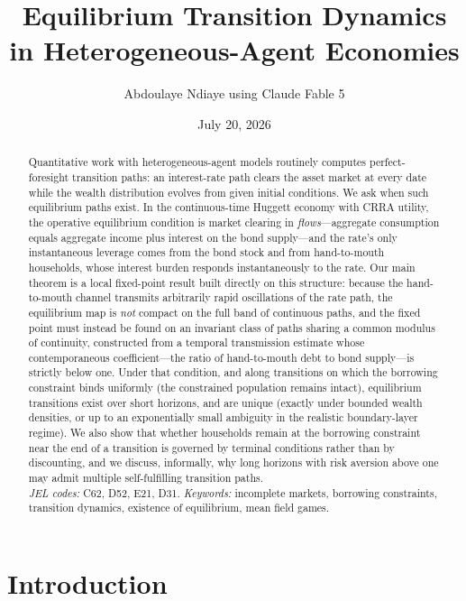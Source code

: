 \documentclass[11pt]{article}
\title{Equilibrium Transition Dynamics in Heterogeneous-Agent
Economies}
\author{Abdoulaye Ndiaye using Claude Fable 5}
\date{July 20, 2026}
\theoremstyle{definition}
\theoremstyle{remark}
\begin{document}
\maketitle

\begin{abstract}
\noindent
Quantitative work with heterogeneous-agent models routinely computes
perfect-foresight transition paths: an interest-rate path clears the
asset market at every date while the wealth distribution evolves from
given initial conditions. We ask when such equilibrium paths exist. In
the continuous-time Huggett economy with CRRA utility, the operative
equilibrium condition is market clearing in \emph{flows}---aggregate
consumption equals aggregate income plus interest on the bond
supply---and the rate's only instantaneous leverage comes from the
bond stock and from hand-to-mouth households, whose interest burden
responds instantaneously to the rate. Our main theorem is a local
fixed-point result built directly on this structure: because the
hand-to-mouth channel transmits arbitrarily rapid oscillations of the
rate path, the equilibrium map is \emph{not} compact on the full band
of continuous paths, and the fixed point must instead be found on an
invariant class of paths sharing a common modulus of continuity,
constructed from a temporal transmission estimate whose
contemporaneous coefficient---the ratio of hand-to-mouth debt to bond
supply---is strictly below one. Under that condition, and along
transitions on which the borrowing constraint binds uniformly (the
constrained population remains intact), equilibrium transitions exist
over short horizons, and are unique (exactly under bounded wealth
densities, or up to an exponentially small ambiguity in the realistic
boundary-layer regime). We also show that whether households remain at the borrowing
constraint near the end of a transition is governed by terminal
conditions rather than by discounting, and we discuss, informally, why
long horizons with risk aversion above one may admit multiple
self-fulfilling transition paths.\\[0.5em]
\emph{JEL codes:} C62, D52, E21, D31.\quad
\emph{Keywords:} incomplete markets, borrowing constraints, transition
dynamics, existence of equilibrium, mean field games.
\end{abstract}

\newpage

\section{Introduction}
\label{sec:intro}
\end{document}
